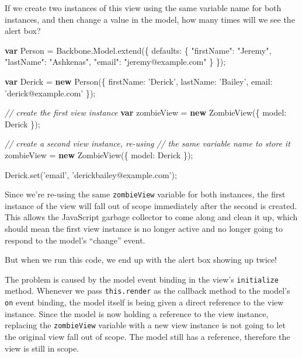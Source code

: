 \documentclass[9pt]{book}
\newenvironment{Shaded}{}{}
\newcommand{\KeywordTok}[1]{\textcolor[rgb]{0.00,0.44,0.13}{\textbf{{#1}}}}
\newcommand{\DataTypeTok}[1]{\textcolor[rgb]{0.56,0.13,0.00}{{#1}}}
\newcommand{\StringTok}[1]{\textcolor[rgb]{0.25,0.44,0.63}{{#1}}}
\newcommand{\CommentTok}[1]{\textcolor[rgb]{0.38,0.63,0.69}{\textit{{#1}}}}
\newcommand{\OtherTok}[1]{\textcolor[rgb]{0.00,0.44,0.13}{{#1}}}
\newcommand{\FunctionTok}[1]{\textcolor[rgb]{0.02,0.16,0.49}{{#1}}}
\newcommand{\NormalTok}[1]{{#1}}
\begin{document}
If we create two instances of this view using the same variable name for
both instances, and then change a value in the model, how many times
will we see the alert box?

\begin{Shaded}
\begin{Highlighting}[]

\KeywordTok{var} \NormalTok{Person = }\OtherTok{Backbone}\NormalTok{.}\OtherTok{Model}\NormalTok{.}\FunctionTok{extend}\NormalTok{(\{}
  \DataTypeTok{defaults}\NormalTok{: \{}
    \StringTok{"firstName"}\NormalTok{: }\StringTok{"Jeremy"}\NormalTok{,}
    \StringTok{"lastName"}\NormalTok{: }\StringTok{"Ashkenas"}\NormalTok{,}
    \StringTok{"email"}\NormalTok{:    }\StringTok{"jeremy@example.com"}
  \NormalTok{\}}
\NormalTok{\});}

\KeywordTok{var} \NormalTok{Derick = }\KeywordTok{new} \FunctionTok{Person}\NormalTok{(\{}
  \DataTypeTok{firstName}\NormalTok{: }\StringTok{'Derick'}\NormalTok{,}
  \DataTypeTok{lastName}\NormalTok{: }\StringTok{'Bailey'}\NormalTok{,}
  \DataTypeTok{email}\NormalTok{: }\StringTok{'derick@example.com'}
\NormalTok{\});}


\CommentTok{// create the first view instance}
\KeywordTok{var} \NormalTok{zombieView = }\KeywordTok{new} \FunctionTok{ZombieView}\NormalTok{(\{}
  \DataTypeTok{model}\NormalTok{: Derick}
\NormalTok{\});}

\CommentTok{// create a second view instance, re-using}
\CommentTok{// the same variable name to store it}
\NormalTok{zombieView = }\KeywordTok{new} \FunctionTok{ZombieView}\NormalTok{(\{}
  \DataTypeTok{model}\NormalTok{: Derick}
\NormalTok{\});}

\OtherTok{Derick}\NormalTok{.}\FunctionTok{set}\NormalTok{(}\StringTok{'email'}\NormalTok{, }\StringTok{'derickbailey@example.com'}\NormalTok{);}
\end{Highlighting}
\end{Shaded}

Since we're re-using the same \texttt{zombieView} variable for both
instances, the first instance of the view will fall out of scope
immediately after the second is created. This allows the JavaScript
garbage collector to come along and clean it up, which should mean the
first view instance is no longer active and no longer going to respond
to the model's ``change'' event.

But when we run this code, we end up with the alert box showing up
twice!

The problem is caused by the model event binding in the view's
\texttt{initialize} method. Whenever we pass \texttt{this.render} as the
callback method to the model's \texttt{on} event binding, the model
itself is being given a direct reference to the view instance. Since the
model is now holding a reference to the view instance, replacing the
\texttt{zombieView} variable with a new view instance is not going to
let the original view fall out of scope. The model still has a
reference, therefore the view is still in scope.
\end{document}
